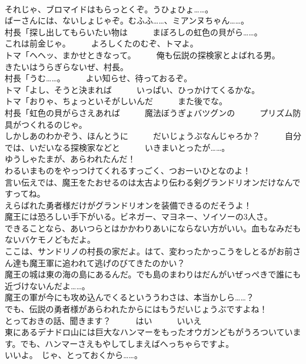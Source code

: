 \documentclass[8pt]{extreport}
\begin{document}
\begin{CJK}{UTF8}{min}
\\	それじゃ、ブロマイドはもらっとくぞ。うひょひょ……。	
\\	ばーさんには、ないしょじゃぞ。むふふ……、ミアンヌちゃん……。	
\\	村長「探し出してもらいたい物は　　　まぼろしの虹色の貝がら……。	
\\	これは前金じゃ。　　　よろしくたのむぞ、トマよ。	
\\	トマ「ヘヘッ、まかせときなって。　　　俺も伝説の探検家とよばれる男。　　　きたいはうらぎらないぜ、村長。	
\\	村長「うむ……。　　　よい知らせ、待っておるぞ。	
\\	トマ「よし、そうと決まれば　　　いっぱい、ひっかけてくるかな。	
\\	トマ「おりゃ、ちょっといそがしいんだ　　　また後でな。	
\\	村長「虹色の貝がらさえあれば　　　魔法ぼうぎょバツグンの　　　プリズム防具がつくれるのじゃ。	
\\	しかしあのわかぞう、ほんとうに　　　だいじょうぶなんじゃろか？　　　自分では、いだいなる探検家などと　　　いきまいとったが……。	
\\	ゆうしゃたまが、あらわれたんだ！	
\\	わるいまものをやっつけてくれるすっごく、つおーいひとなのよ！	
\\	言い伝えでは、魔王をたおせるのは太古より伝わる剣グランドリオンだけなんですってね。	
\\	えらばれた勇者様だけがグランドリオンを装備できるのだそうよ！	
\\	魔王には恐ろしい手下がいる。ビネガー、マヨネー、ソイソーの3人さ。	
\\	できることなら、あいつらとはかかわりあいにならない方がいい。血もなみだもないバケモノどもだよ。	
\\	ここは、サンドリノの村長の家だよ。はて、変わったかっこうをしとるがお前さん達も魔王軍に追われて逃げのびてきたのかい？	
\\	魔王の城は東の海の島にあるんだ。でも島のまわりはだんがいぜっぺきで誰にも近づけないんだよ……。	
\\	魔王の軍が今にも攻め込んでくるといううわさは、本当かしら……？	
\\	でも、伝説の勇者様があらわれたからにはもうだいじょうぶですよね！	
\\	とっておきの話、聞きます？　　　はい　　　いいえ	
\\	東にあるデナドロ山には巨大なハンマーをもったオウガンどもがうろついています。でも、ハンマーさえもやしてしまえばへっちゃらですよ。	
\\	いいよ。　じゃ、とっておくから……。	

\end{CJK}
\end{document}
